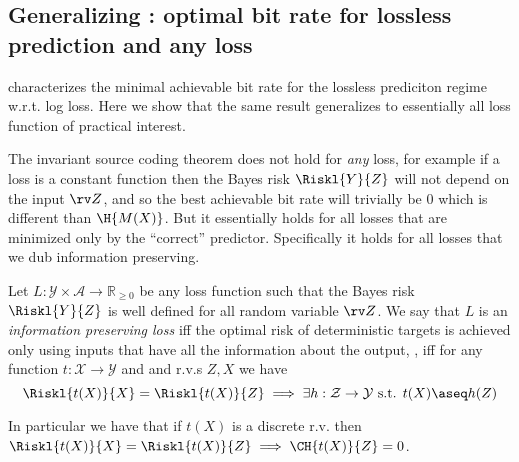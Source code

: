\documentclass[final]{article}
\begin{document}
\subsection{Generalizing \texorpdfstring{}{Theorem 2}: optimal bit rate for lossless prediction and any loss}
\label{appx:theorem_lossless}



 characterizes the minimal achievable bit rate for the lossless prediciton regime w.r.t. log loss.
Here we show that the same result generalizes to essentially all loss function of practical interest.





The invariant source coding theorem does not hold for \textit{any} loss, for example if a loss is a constant function then the Bayes risk $\Riskl{Y}{Z}$ will not depend on the input $\rv Z$, and so the best achievable bit rate will trivially be 0 which is different than $\H{M(X)}$.
But it essentially holds for all losses that are minimized only by the ``correct'' predictor.
Specifically it holds for all losses that we dub information preserving.

\begin{definition}\label{def:meaningful}
Let $L : \mathcal{Y} \times \mathcal{A} \to \mathbb{R}_{\geq 0}$ be any loss function such that the Bayes risk $\Riskl{Y}{Z}$ is well defined for all random variable $\rv Z$.
We say that $L$ is an \textit{information preserving loss} iff the optimal risk of deterministic targets is achieved only using inputs that have all the information about the output, \ie, iff for any function $t : \mathcal{X} \to \mathcal{Y}$ and and r.v.s $Z,X$ we have
\begin{equation}
\Riskl{t(X)}{X} = \Riskl{t(X)}{Z} \implies \exists h: \mathcal{Z} \to \mathcal{Y} \text{ s.t. } t(X) \aseq h(Z)
\end{equation}
\end{definition}



In particular we have that if $t(X)$ is a discrete r.v. then $\Riskl{t(X)}{X} = \Riskl{t(X)}{Z} \implies \CH{t(X)}{Z} = 0$.
\end{document}
